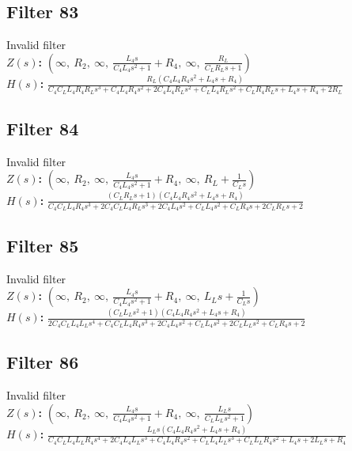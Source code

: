 \documentclass{article}
\begin{document}
\subsection*{Filter 83}
Invalid filter \\ 
\textbf{$Z(s)$:} $\left( \infty, \  R_{2}, \  \infty, \  \frac{L_{4} s}{C_{4} L_{4} s^{2} + 1} + R_{4}, \  \infty, \  \frac{R_{L}}{C_{L} R_{L} s + 1}\right)$ \\ 
\textbf{$H(s)$:} $\frac{R_{L} \left(C_{4} L_{4} R_{4} s^{2} + L_{4} s + R_{4}\right)}{C_{4} C_{L} L_{4} R_{4} R_{L} s^{3} + C_{4} L_{4} R_{4} s^{2} + 2 C_{4} L_{4} R_{L} s^{2} + C_{L} L_{4} R_{L} s^{2} + C_{L} R_{4} R_{L} s + L_{4} s + R_{4} + 2 R_{L}}$ \\ 
\subsection*{Filter 84}
Invalid filter \\ 
\textbf{$Z(s)$:} $\left( \infty, \  R_{2}, \  \infty, \  \frac{L_{4} s}{C_{4} L_{4} s^{2} + 1} + R_{4}, \  \infty, \  R_{L} + \frac{1}{C_{L} s}\right)$ \\ 
\textbf{$H(s)$:} $\frac{\left(C_{L} R_{L} s + 1\right) \left(C_{4} L_{4} R_{4} s^{2} + L_{4} s + R_{4}\right)}{C_{4} C_{L} L_{4} R_{4} s^{3} + 2 C_{4} C_{L} L_{4} R_{L} s^{3} + 2 C_{4} L_{4} s^{2} + C_{L} L_{4} s^{2} + C_{L} R_{4} s + 2 C_{L} R_{L} s + 2}$ \\ 
\subsection*{Filter 85}
Invalid filter \\ 
\textbf{$Z(s)$:} $\left( \infty, \  R_{2}, \  \infty, \  \frac{L_{4} s}{C_{4} L_{4} s^{2} + 1} + R_{4}, \  \infty, \  L_{L} s + \frac{1}{C_{L} s}\right)$ \\ 
\textbf{$H(s)$:} $\frac{\left(C_{L} L_{L} s^{2} + 1\right) \left(C_{4} L_{4} R_{4} s^{2} + L_{4} s + R_{4}\right)}{2 C_{4} C_{L} L_{4} L_{L} s^{4} + C_{4} C_{L} L_{4} R_{4} s^{3} + 2 C_{4} L_{4} s^{2} + C_{L} L_{4} s^{2} + 2 C_{L} L_{L} s^{2} + C_{L} R_{4} s + 2}$ \\ 
\subsection*{Filter 86}
Invalid filter \\ 
\textbf{$Z(s)$:} $\left( \infty, \  R_{2}, \  \infty, \  \frac{L_{4} s}{C_{4} L_{4} s^{2} + 1} + R_{4}, \  \infty, \  \frac{L_{L} s}{C_{L} L_{L} s^{2} + 1}\right)$ \\ 
\textbf{$H(s)$:} $\frac{L_{L} s \left(C_{4} L_{4} R_{4} s^{2} + L_{4} s + R_{4}\right)}{C_{4} C_{L} L_{4} L_{L} R_{4} s^{4} + 2 C_{4} L_{4} L_{L} s^{3} + C_{4} L_{4} R_{4} s^{2} + C_{L} L_{4} L_{L} s^{3} + C_{L} L_{L} R_{4} s^{2} + L_{4} s + 2 L_{L} s + R_{4}}$ \\ 
\end{document}
